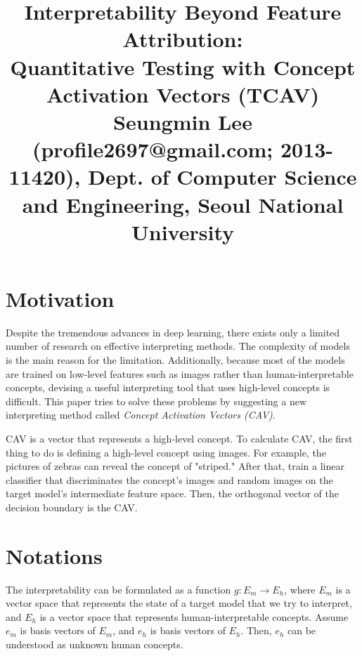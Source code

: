 \documentclass[10pt,twocolumn,letterpaper]{article}
\begin{document}
\title{Interpretability Beyond Feature Attribution: \\Quantitative Testing with Concept Activation Vectors (TCAV)
	 \\ {\rm {\normalsize Seungmin Lee (profile2697@gmail.com; 2013-11420), Dept. of Computer Science and Engineering, Seoul National University}}} 

\maketitle
\thispagestyle{empty}


\section{Motivation}
Despite the tremendous advances in deep learning, there exists only a limited number of research on effective interpreting methods. The complexity of models is the main reason for the limitation. Additionally, because most of the models are trained on low-level features such as images rather than human-interpretable concepts, devising a useful interpreting tool that uses high-level concepts is difficult. This paper tries to solve these problems by suggesting a new interpreting method called \textit{Concept Activation Vectors (CAV)}. 

CAV is a vector that represents a high-level concept. To calculate CAV, the first thing to do is defining a high-level concept using images. For example, the pictures of zebras can reveal the concept of "striped." After that, train a linear classifier that discriminates the concept's images and random images on the target model's intermediate feature space. Then, the orthogonal vector of the decision boundary is the CAV.

\section{Notations}
The interpretability can be formulated as a function $g: E_m \rightarrow E_h$, where $E_m$ is a vector space that represents the state of a target model that we try to interpret, and $E_h$ is a vector space that represents human-interpretable concepts. Assume $e_m$ is basis vectors of $E_m$, and $e_h$ is basis vectors of $E_h$. Then, $e_h$ can be understood as unknown human concepts. 
\end{document}
